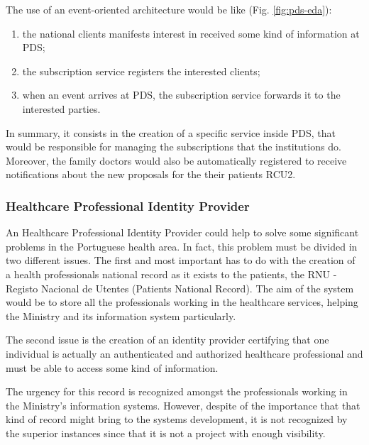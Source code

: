 
The use of an event-oriented architecture would be like (Fig. \ref{fig:pds-eda}):
\begin{enumerate}
\item the national clients manifests interest in received some kind of information at PDS;
\item the subscription service registers the interested clients;
\item when an event arrives at PDS, the subscription service forwards it to the interested parties.
\end{enumerate}

In summary, it consists in the creation of a specific service inside PDS, that would be responsible for managing the subscriptions that the institutions do. Moreover, the family doctors would also be automatically registered to receive notifications about the new proposals for the their patients RCU2.

\subsubsection{Healthcare Professional Identity Provider}\label{sec:hpip}

An Healthcare Professional Identity Provider could help to solve some significant problems in the Portuguese health area. In fact, this problem must be divided in two different issues. The first and most important has to do with the creation of a health professionals national record as it exists to the patients, the RNU - Registo Nacional de Utentes (Patients National Record). The aim of the system would be to store all the professionals working in the healthcare services, helping the Ministry and its information system particularly.

The second issue is the creation of an identity provider certifying that one individual is actually an authenticated and authorized healthcare professional and must be able to access some kind of information.

The urgency for this record is recognized amongst the professionals working in the Ministry's information systems. However, despite of the importance that that kind of record might bring to the systems development, it is not recognized by the superior instances since that it is not a project with enough visibility.




